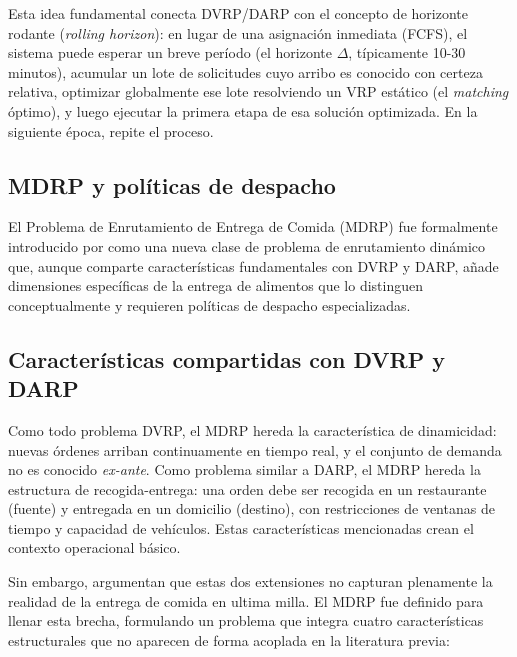 \documentclass[12pt,letterpaper,oneside]{book}
\begin{document}
Esta idea fundamental conecta DVRP/DARP con el concepto de horizonte rodante (\textit{rolling horizon}): 
en lugar de una asignación inmediata (FCFS), el sistema puede esperar un breve período (el horizonte $\Delta$, 
típicamente 10-30 minutos), acumular un lote de solicitudes cuyo arribo es conocido con certeza relativa, 
optimizar globalmente ese lote resolviendo un VRP estático (el \textit{matching} óptimo), y luego ejecutar la
primera etapa de esa solución optimizada. En la siguiente época, repite el proceso.

\subsection{MDRP y políticas de despacho} %

\nocite{Pereira2021,Boyaci2021}

El Problema de Enrutamiento de Entrega de Comida (MDRP) fue formalmente introducido por \citet{Reyes2018}
como una nueva clase de problema de enrutamiento dinámico que, aunque comparte características fundamentales con 
DVRP y DARP, añade dimensiones específicas de la entrega de alimentos que lo distinguen conceptualmente y 
requieren políticas de despacho especializadas.

\subsection{Características compartidas con DVRP y DARP}

Como todo problema DVRP, el MDRP hereda la característica de dinamicidad: nuevas órdenes arriban 
continuamente en tiempo real, y el conjunto de demanda no es conocido \textit{ex-ante}. Como problema 
similar a DARP, el MDRP hereda la estructura de recogida-entrega: una orden debe ser recogida en un 
restaurante (fuente) y entregada en un domicilio (destino), con restricciones de ventanas de tiempo y 
capacidad de vehículos. Estas características mencionadas crean el 
contexto operacional básico.

Sin embargo, \citet{Reyes2018} argumentan que estas dos extensiones no capturan plenamente la realidad de
la entrega de comida en ultima milla. El MDRP fue definido para llenar esta brecha, formulando un problema que 
integra cuatro características estructurales que no aparecen de forma acoplada en la literatura previa:
\end{document}
